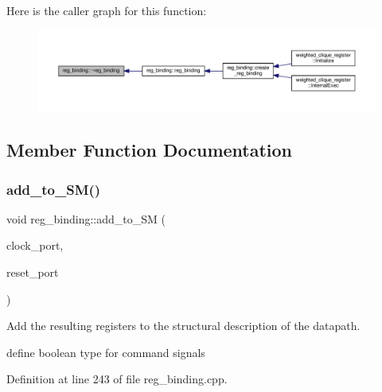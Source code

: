 Here is the caller graph for this function\+:
\nopagebreak
\begin{figure}[H]
\begin{center}
\leavevmode
\includegraphics[width=350pt]{da/d7c/classreg__binding_a4e041c68851cd271288ca373ab2f7e31_icgraph}
\end{center}
\end{figure}


\subsection{Member Function Documentation}
\mbox{\label{classreg__binding_aaf06706babf5b4d7ed2bc1c9849fd10a}} 
\subsubsection{\texorpdfstring{add\+\_\+to\+\_\+\+S\+M()}{add\_to\_SM()}}
{\footnotesize\ttfamily void reg\+\_\+binding\+::add\+\_\+to\+\_\+\+SM (\begin{DoxyParamCaption}\item[{\hyperlink{structural__objects_8hpp_a8ea5f8cc50ab8f4c31e2751074ff60b2}{structural\+\_\+object\+Ref}}]{clock\+\_\+port,  }\item[{\hyperlink{structural__objects_8hpp_a8ea5f8cc50ab8f4c31e2751074ff60b2}{structural\+\_\+object\+Ref}}]{reset\+\_\+port }\end{DoxyParamCaption})\hspace{0.3cm}{\ttfamily [virtual]}}



Add the resulting registers to the structural description of the datapath. 

define boolean type for command signals 

Definition at line 243 of file reg\+\_\+binding.\+cpp.



